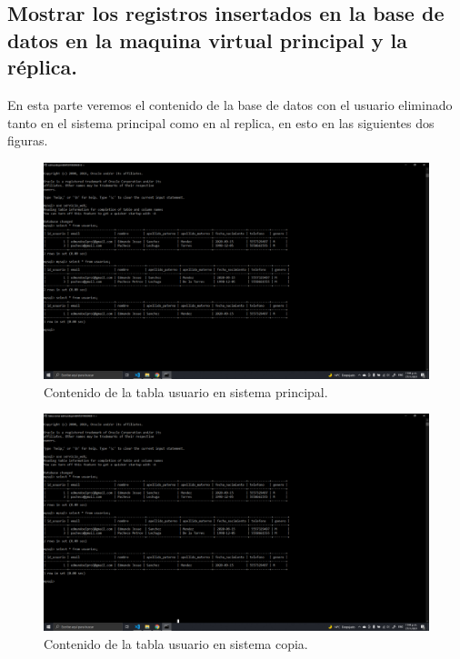\documentclass[11pt]{article}
\begin{document}
		\subsection{Mostrar los registros insertados en la base de datos en la maquina virtual principal y la réplica.}
		En esta parte veremos el contenido de la base de datos con el usuario eliminado tanto en el sistema principal como en al replica, en esto en las siguientes dos figuras.
		\begin{figure}[H]
			\centering
			\includegraphics[scale=0.34]{resources/p9.9principal.png}
			\caption{Contenido de la tabla usuario en sistema principal.}\label{fig:picture}
		\end{figure}	
		\begin{figure}[H]
			\centering
			\includegraphics[scale=0.34]{resources/p9.9copia.png}
			\caption{Contenido de la tabla usuario en sistema copia.}\label{fig:picture}
		\end{figure}	
\end{document}
